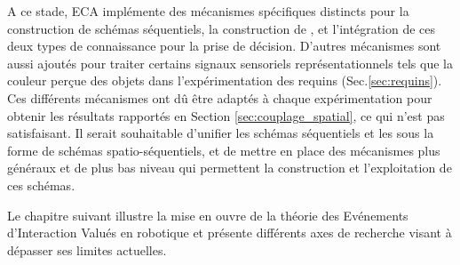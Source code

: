 A ce stade, ECA implémente des mécanismes spécifiques distincts pour la construction de schémas séquentiels, la construction de , et l'intégration de ces deux types de connaissance pour la prise de décision.
D'autres mécanismes sont aussi ajoutés pour traiter certains signaux sensoriels représentationnels tels que la couleur perçue des objets dans l'expérimentation des requins (Sec.\ref{sec:requins}). 
Ces différents mécanismes ont dû être adaptés à chaque expérimentation pour obtenir les résultats rapportés en Section \ref{sec:couplage_spatial}, ce qui n'est pas satisfaisant.
Il serait souhaitable d'unifier les schémas séquentiels et les  sous la forme de schémas spatio-séquentiels, et de mettre en place des mécanismes plus généraux et de plus bas niveau qui permettent la construction et l'exploitation de ces schémas.

Le chapitre suivant illustre la mise en ouvre de la théorie des Evénements d'Interaction Valués en robotique et présente différents axes de recherche visant à dépasser ses limites actuelles.


